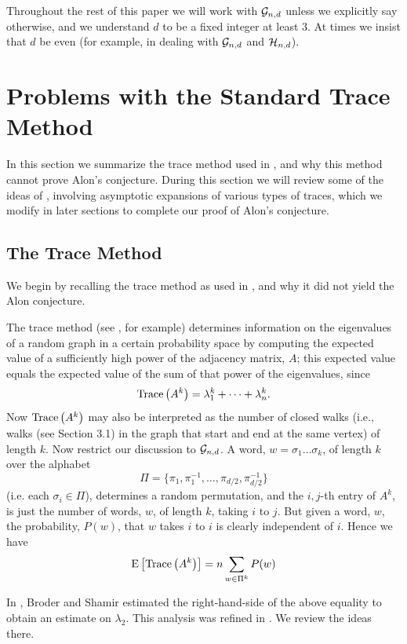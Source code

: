 \documentclass[12pt]{article}
\newcommand{\cg}{{\cal G}}
\newcommand{\ch}{{\cal H}}
\newcommand{\cgnd}{\cg_{n,d}}
\newcommand{\chnd}{\ch_{n,d}}
\newcommand{\E}[1]{\mbox{E}\left[#1\right] }
\newcommand{\Trace}[1]{{\rm Trace}\left( #1 \right) }
\begin{document}
Throughout the rest of this paper we will work with $\cgnd$ unless
we explicitly say otherwise, and we understand $d$ to be a fixed
integer at least
$3$.  At times we insist that $d$ be even (for example, in
dealing with $\cgnd$ and $\chnd$).




\section{Problems with the Standard Trace Method}
\label{se:problem}

In this section we summarize the trace method used in
\cite{friedman_random_graphs}, and why 
this method cannot prove Alon's conjecture.
During this section we will review some of the ideas of
\cite{friedman_random_graphs}, involving asymptotic expansions of
various types of traces, which we modify in later sections
to complete our proof of Alon's
conjecture.


\subsection{The Trace Method}

We begin by recalling the trace method as used in
\cite{friedman_random_graphs}, and why it did not yield the Alon
conjecture.

The trace method (see \cite{wigner,geman,komlos,mckay,broder,
friedman_random_graphs}, for example) determines information on the
eigenvalues of a random graph in a certain probability space by computing
the expected value of a sufficiently high power of the adjacency matrix, $A$;
this expected value equals the expected value of the sum of that power of the
eigenvalues, since
$$
\Trace{A^k} = \lambda_1^k+\cdots+\lambda_n^k.
$$
Now $\Trace{A^k}$ may also be interpreted as the number of closed
walks (i.e., walks (see Section 3.1) in the
graph that start and end at the same vertex) of length $k$.
Now restrict our discussion to $\cgnd$.
A word, $w=\sigma_1\ldots\sigma_k$, of length $k$ over the alphabet
$$
\Pi=\{ \pi_1,\pi_1^{-1},\ldots,\pi_{d/2},\pi_{d/2}^{-1} \}
$$
(i.e. each $\sigma_i\in\Pi$), determines a random permutation, and the
$i,j$-th entry of $A^k$, is just the number of words, $w$, of length $k$,
taking $i$ to $j$.
But given a word, $w$, the probability, $P(w)$, that $w$
takes $i$ to $i$ is clearly independent of $i$.
Hence we have
$$
\E{\Trace{A^k}} = n \sum_{w\in\Pi^k} P(w)
$$

In \cite{broder}, Broder and Shamir estimated the right-hand-side of the
above equality to obtain an estimate on $\lambda_2$.  This analysis was
refined in \cite{friedman_random_graphs}.  We review the ideas there.
\end{document}
